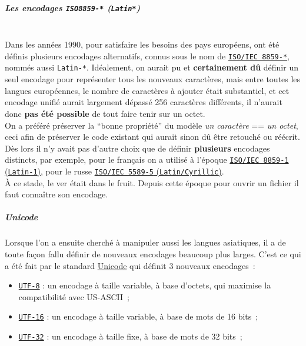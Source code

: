     \hypertarget{les-encodages-iso8859--latin}{%
\subparagraph{\texorpdfstring{Les encodages \texttt{ISO8859-*}
(\texttt{Latin*})}{Les encodages ISO8859-* (Latin*)}\\\\}\label{les-encodages-iso8859--latin}}

    Dans les années 1990, pour satisfaire les besoins des pays européens,
ont été définis plusieurs encodages alternatifs, connus sous le nom de
\href{http://en.wikipedia.org/wiki/ISO/IEC_8859}{\texttt{ISO/IEC\ 8859-*}},
nommés aussi \texttt{Latin-*}. Idéalement, on aurait pu et
\textbf{certainement dû} définir un seul encodage pour représenter tous
les nouveaux caractères, mais entre toutes les langues européennes, le
nombre de caractères à ajouter était substantiel, et cet encodage unifié
aurait largement dépassé 256 caractères différents, il n'aurait donc
\textbf{pas été possible} de tout faire tenir sur un octet.\\

On a préféré préserver la ``bonne propriété'' du modèle \emph{un
caractère} == \emph{un octet}, ceci afin de préserver le code existant
qui aurait sinon dû être retouché ou réécrit.\\

Dès lors il n'y avait pas d'autre choix que de définir
\textbf{plusieurs} encodages distincts, par exemple, pour le français on
a utilisé à l'époque
\href{http://en.wikipedia.org/wiki/ISO/IEC_8859-1}{\texttt{ISO/IEC\ 8859-1}
(\texttt{Latin-1})}, pour le russe
\href{http://en.wikipedia.org/wiki/ISO/IEC_8859-5}{\texttt{ISO/IEC\ 5589-5}
(\texttt{Latin/Cyrillic})}.\\

À ce stade, le ver était dans le fruit. Depuis cette époque pour ouvrir
un fichier il faut connaître son encodage.

    \hypertarget{unicode}{%
\subparagraph{Unicode}\label{unicode}}

    Lorsque l'on a ensuite cherché à manipuler aussi les langues asiatiques,
il a de toute façon fallu définir de nouveaux encodages beaucoup plus
larges. C'est ce qui a été fait par le standard
\href{http://en.wikipedia.org/wiki/Unicode}{Unicode} qui définit 3
nouveaux encodages~:

\begin{itemize}
	\item
	\href{http://en.wikipedia.org/wiki/UTF-8}{\texttt{UTF-8}} : un encodage
	à taille variable, à base d'octets, qui maximise la compatibilité avec
	US-ASCII~;
	\item
	\href{http://en.wikipedia.org/wiki/UTF-16}{\texttt{UTF-16}}
	: un encodage à taille variable, à base de mots de 16 bits~;
	\item
	\href{http://en.wikipedia.org/wiki/UTF-32}{\texttt{UTF-32}} : un
	encodage à taille fixe, à base de mots de 32 bits~;
\end{itemize}

